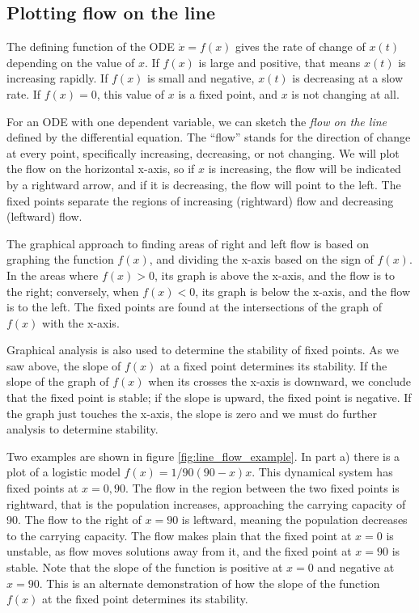 \documentclass[11pt]{book}
\begin{document}
\subsection{Plotting flow on the line}
The defining function of the ODE $\dot x = f(x)$ gives the rate of change of $x(t)$ depending on the value of $x$. If $f(x)$ is large and positive, that means $x(t)$ is increasing rapidly. If $f(x)$ is small and negative, $x(t)$ is decreasing at a slow rate. If $f(x)=0$, this value of $x$ is a fixed point, and $x$ is not changing at all.

For an ODE with one dependent variable, we can sketch the \emph{flow on the line} defined by the differential equation. The ``flow'' stands for the direction of change at every point, specifically increasing, decreasing, or not changing. We will plot the flow on the horizontal x-axis, so if $x$ is increasing, the flow will be indicated by a rightward arrow, and if it is decreasing, the flow will point to the left. The fixed points separate the regions of increasing (rightward) flow and decreasing (leftward) flow.

The graphical approach to finding areas of right and left flow is based on graphing the function $f(x)$, and dividing the x-axis based on the sign of $f(x)$. In the areas where $f(x) > 0$, its graph is above the x-axis, and the flow is to the right; conversely, when $f(x) < 0$, its graph is below the x-axis, and the flow is to the left. The fixed points are found at the intersections of the graph of $f(x)$ with the x-axis.

Graphical analysis is also used to determine the stability of fixed points. As we saw above, the slope of $f(x)$ at a fixed point determines its stability. If the slope of the graph of $f(x)$ when its crosses the x-axis is downward, we conclude that the fixed point is stable; if the slope is upward, the fixed point is negative. If the graph just touches the x-axis, the slope is zero and we must do further analysis to determine stability.

Two examples are shown in figure \ref{fig:line_flow_example}. In part a) there is a plot of a logistic model $f(x) =  1/90(90-x)x$. This dynamical system has fixed points at $x = 0, 90$. The flow in the region between the two fixed points is rightward, that is the population increases, approaching the carrying capacity of 90. The flow to the right of $x=90$ is leftward, meaning the population decreases to the carrying capacity. The flow makes plain that the fixed point  at $x=0$ is unstable, as flow moves solutions away from it, and the fixed point at $x=90$ is stable. Note that the slope of the function is positive at $x=0$ and negative at $x=90$. This is an alternate demonstration of how the slope of the function $f(x)$ at the fixed point determines its stability.
\end{document}
